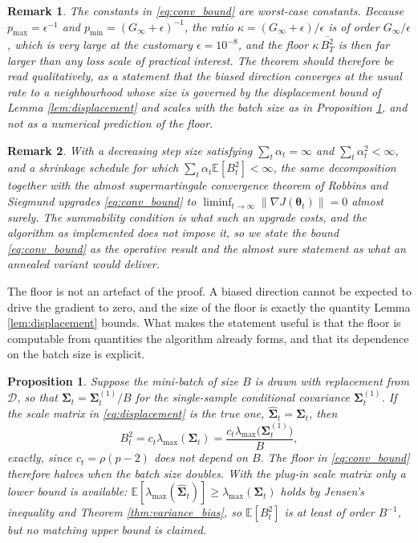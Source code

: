 \documentclass[pdflatex,sn-mathphys-num]{sn-jnl}%
\theoremstyle{thmstyleone}%
\newtheorem{proposition}[theorem]{Proposition}%
\theoremstyle{thmstyletwo}%
\newtheorem{remark}{Remark}%
\theoremstyle{thmstylethree}%
\newcommand{\rev}[1]{#1}
\newenvironment{revblock}{}{}
\newcommand{\E}{\mathbb{E}}
\begin{document}
\begin{remark}
\label{rem:constants}
The constants in \eqref{eq:conv_bound} are worst-case constants. Because $p_{\max}=\epsilon^{-1}$ and $p_{\min}=(G_\infty+\epsilon)^{-1}$, the ratio $\kappa=(G_\infty+\epsilon)/\epsilon$ is of order $G_\infty/\epsilon$, which is very large at the customary $\epsilon=10^{-8}$, and the floor $\kappa\,\overline{B^2_T}$ is then far larger than any loss scale of practical interest. The theorem should therefore be read qualitatively, as a statement that the biased direction converges at the usual rate to a neighbourhood whose size is governed by the displacement bound of Lemma \ref{lem:displacement} and scales with the batch size as in Proposition \ref{prop:batch}, and not as a numerical prediction of the floor.
\end{remark}

\begin{remark}
With a decreasing step size satisfying $\sum_t\alpha_t=\infty$ and $\sum_t\alpha^2_t<\infty$, and a shrinkage schedule for which $\sum_t\alpha_t\E[B^2_t]<\infty$, the same decomposition together with the almost supermartingale convergence theorem of Robbins and Siegmund \cite{robbins1971} upgrades \eqref{eq:conv_bound} to $\liminf_{t\to\infty}\|\nabla J(\bm\theta_t)\|=0$ almost surely. The summability condition is what such an upgrade costs, and the algorithm as implemented does not impose it, so we state the bound \eqref{eq:conv_bound} as the operative result and the almost sure statement as what an annealed variant would deliver.
\end{remark}

The floor is not an artefact of the proof. A biased direction cannot be expected to drive the gradient to zero, and the size of the floor is exactly the quantity Lemma \ref{lem:displacement} bounds. What makes the statement useful is that the floor is computable from quantities the algorithm already forms, and that its dependence on the batch size is explicit.

\begin{proposition}
\label{prop:batch}
Suppose the mini-batch of size $B$ is drawn with replacement from $\mathcal D$, so that $\bm\Sigma_t=\bm\Sigma^{(1)}_t/B$ for the single-sample conditional covariance $\bm\Sigma^{(1)}_t$. If the scale matrix in \eqref{eq:displacement} is the true one, $\widehat{\bm\Sigma}_t=\bm\Sigma_t$, then
\begin{equation}
B^2_t=c_t\lambda_{\max}(\bm\Sigma_t)=\frac{c_t\lambda_{\max}\bigl(\bm\Sigma^{(1)}_t\bigr)}{B},
\end{equation}
exactly, since $c_t=\rho(p-2)$ does not depend on $B$. The floor in \eqref{eq:conv_bound} therefore halves when the batch size doubles. With the plug-in scale matrix \rev{only a lower bound is available: $\E[\lambda_{\max}(\widehat{\bm\Sigma}_t)]\ge\lambda_{\max}(\bm\Sigma_t)$ holds by Jensen's inequality and Theorem \ref{thm:variance_bias}, so $\E[B^2_t]$ is at least of order $B^{-1}$, but no matching upper bound is claimed.}
\end{proposition}
\end{document}
